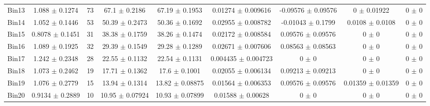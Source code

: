 \begin{tabular}{@{\extracolsep{4pt}}lcccccccc@{}}
     Bin13 & 1.088 $\pm$ 0.1274 & 73 & 67.1 $\pm$ 0.2186 & 67.19 $\pm$ 0.1953 & 0.01274 $\pm$ 0.009616 & -0.09576 $\pm$ 0.09576 & 0 $\pm$ 0.01922 & 0 $\pm$ 0 \\ 
     Bin14 & 1.052 $\pm$ 0.1446 & 53 & 50.39 $\pm$ 0.2473 & 50.36 $\pm$ 0.1692 & 0.02955 $\pm$ 0.008782 & -0.01043 $\pm$ 0.1799 & 0.0108 $\pm$ 0.0108 & 0 $\pm$ 0 \\ 
     Bin15 & 0.8078 $\pm$ 0.1451 & 31 & 38.38 $\pm$ 0.1759 & 38.26 $\pm$ 0.1474 & 0.02172 $\pm$ 0.008584 & 0.09576 $\pm$ 0.09576 & 0 $\pm$ 0 & 0 $\pm$ 0 \\ 
     Bin16 & 1.089 $\pm$ 0.1925 & 32 & 29.39 $\pm$ 0.1549 & 29.28 $\pm$ 0.1289 & 0.02671 $\pm$ 0.007606 & 0.08563 $\pm$ 0.08563 & 0 $\pm$ 0 & 0 $\pm$ 0 \\ 
     Bin17 & 1.242 $\pm$ 0.2348 & 28 & 22.55 $\pm$ 0.1132 & 22.54 $\pm$ 0.1131 & 0.004435 $\pm$ 0.004723 & 0 $\pm$ 0 & 0 $\pm$ 0 & 0 $\pm$ 0 \\ 
     Bin18 & 1.073 $\pm$ 0.2462 & 19 & 17.71 $\pm$ 0.1362 & 17.6 $\pm$ 0.1001 & 0.02055 $\pm$ 0.006134 & 0.09213 $\pm$ 0.09213 & 0 $\pm$ 0 & 0 $\pm$ 0 \\ 
     Bin19 & 1.076 $\pm$ 0.2779 & 15 & 13.94 $\pm$ 0.1314 & 13.82 $\pm$ 0.08875 & 0.01564 $\pm$ 0.006353 & 0.09576 $\pm$ 0.09576 & 0.01359 $\pm$ 0.01359 & 0 $\pm$ 0 \\ 
     Bin20 & 0.9134 $\pm$ 0.2889 & 10 & 10.95 $\pm$ 0.07924 & 10.93 $\pm$ 0.07899 & 0.01588 $\pm$ 0.00628 & 0 $\pm$ 0 & 0 $\pm$ 0 & 0 $\pm$ 0 \\ 
\hline\hline
  \end{tabular}
